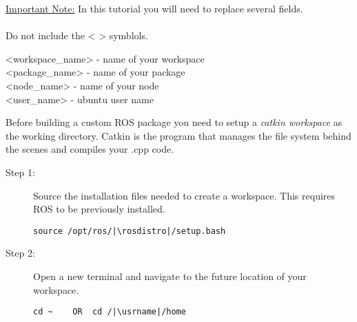 \documentclass[12pt]{article}
\newcommand{\R}{\color{red}}
\newcommand{\B}{\color{blue}}
\newcommand{\K}{\color{black}}
\newcommand{\G}{\color{mygreen}}
\newcommand{\PR}{\color{mypurple}}
\newcommand{\usrname}{\B<user\_name>\K}
\newcommand{\pkgname}{\G<package\_name>\K}
\newcommand{\wspname}{\R<workspace\_name>\K}
\newcommand{\nodname}{\PR<node\_name>\K}
\newcommand{\rosdistro}{melodic}
\begin{document}
\begin{description}[labelindent=1cm]
\begin{framed}
	\item[\underline{Important Note:}] In this tutorial you will need to replace several fields. \\\\Do not include the < > symblols.

    \wspname \hspace{2mm} - name of your workspace \\
    \pkgname \hspace{2mm} - name of your package \\
    \nodname \hspace{2mm} - name of your node \\
	\usrname \hspace{2mm} - ubuntu user name\\
	
	\end{framed}
	\newpage
	
	\item[\textbf{\underline{ Part I - Setup the \href{http://wiki.ros.org/catkin/Tutorials/create_a_workspace}{Workspace:} }}] \hfill \vspace{0mm}
	
	Before building a custom ROS package you need to setup a {\it catkin workspace} as the working directory. Catkin is the program that manages the file system behind the scenes and compiles your .cpp code. 
	
	\begin{description}
		\item[Step 1:] Source the installation files needed to create a workspace. This requires ROS to be previously installed.
		\begin{verbatim}
source /opt/ros/|\rosdistro|/setup.bash
		\end{verbatim}
		
		\item[Step 2:] Open a new terminal and navigate to the future location of your workspace.
		\begin{verbatim}
cd ~	OR	cd /|\usrname|/home
		\end{verbatim}
		

\end{description}
\end{description}
\end{document}
